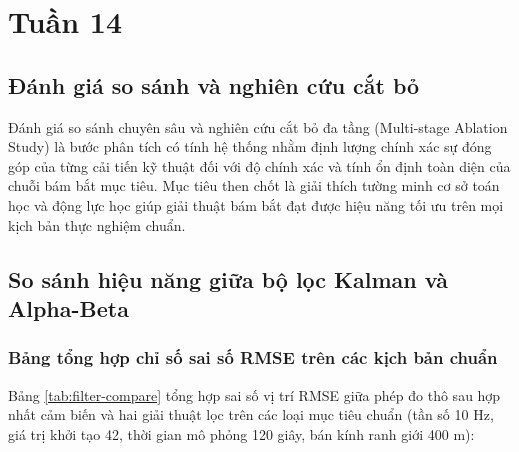 \section{Tuần 14}

\subsection{Đánh giá so sánh và nghiên cứu cắt bỏ}

\hspace{0.5cm} Đánh giá so sánh chuyên sâu và nghiên cứu cắt bỏ đa tầng (Multi-stage Ablation Study) là bước phân tích có tính hệ thống nhằm định lượng chính xác sự đóng góp của từng cải tiến kỹ thuật đối với độ chính xác và tính ổn định toàn diện của chuỗi bám bắt mục tiêu. Mục tiêu then chốt là giải thích tường minh cơ sở toán học và động lực học giúp giải thuật bám bắt đạt được hiệu năng tối ưu trên mọi kịch bản thực nghiệm chuẩn.

\subsection{So sánh hiệu năng giữa bộ lọc Kalman và Alpha-Beta}

\subsubsection{Bảng tổng hợp chỉ số sai số RMSE trên các kịch bản chuẩn}

\hspace{0.5cm} Bảng \ref{tab:filter-compare} tổng hợp sai số vị trí RMSE giữa phép đo thô sau hợp nhất cảm biến và hai giải thuật lọc trên các loại mục tiêu chuẩn (tần số 10 Hz, giá trị khởi tạo 42, thời gian mô phỏng 120 giây, bán kính ranh giới 400 m):

\begin{table}[H]
\centering
\caption{So sánh sai số RMSE giữa đo thô, bộ lọc Alpha-Beta và Kalman (Giá trị khởi tạo 42, 120s, 10Hz, 400m)}
\label{tab:filter-compare}
\end{table}

